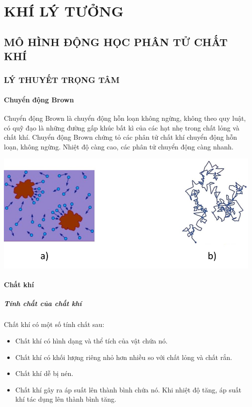 \chapter{KHÍ LÝ TƯỞNG}
\section{MÔ HÌNH ĐỘNG HỌC PHÂN TỬ CHẤT KHÍ}
\subsection{LÝ THUYẾT TRỌNG TÂM}
\begin{tomtat}
	\subsubsection{Chuyển động Brown}
	\begin{dn}
		Chuyển động Brown là chuyển động hỗn loạn không ngừng, không theo quy luật, có quỹ đạo là những đường gấp khúc bất kì của các hạt nhẹ trong chất lỏng và chất khí. Chuyển động Brown chứng tỏ các phân tử chất khí chuyển động hỗn loạn, không ngừng. Nhiệt độ càng cao, các phân tử chuyển động càng nhanh.
	\end{dn}
	\begin{center}
		\includegraphics[width=0.5\linewidth]{figs/VN12-Y24-PH-SYL-009-1}
	\end{center}
	\subsubsection{Chất khí}
	\paragraph{Tính chất của chất khí}
	\begin{boxdn}
		Chất khí có một số tính chất sau:
		\begin{itemize}
			\item Chất khí có hình dạng và thể tích của vật chứa nó.
			\item Chất khí có khối lượng riêng nhỏ hơn nhiều so với chất lỏng và chất rắn.
			\item Chất khí dễ bị nén.
			\item Chất khí gây ra áp suất lên thành bình chứa nó. Khi nhiệt độ tăng, áp suất khí tác dụng lên thành bình tăng.
		\end{itemize}
	\end{boxdn}

\end{tomtat}
